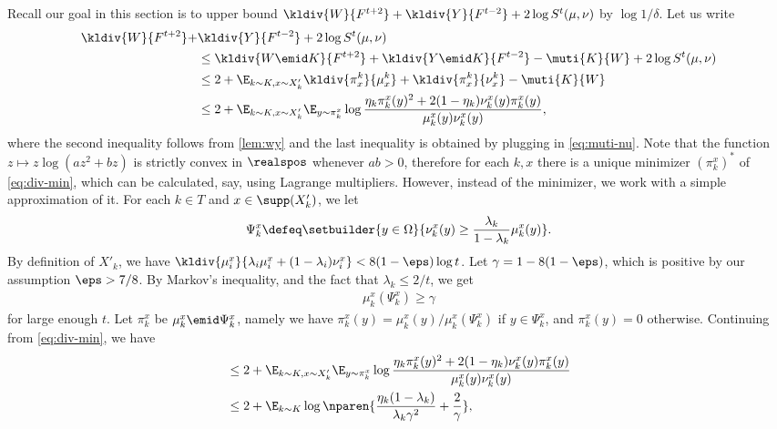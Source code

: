 Recall our goal in this section is to upper bound 
$\kldiv{W}{F^{t+2}} + \kldiv{Y}{F^{t-2}} 
+ 2\log S^t(\mu, \nu)$ by $\log 1/\delta$. 
Let us write
\begin{align}
\kldiv{W}{F^{t+2}} +& \kldiv{Y}{F^{t-2}} 
+ 2\log S^t(\mu, \nu) \nonumber \\
&\le \kldiv{W\emid K}{F^{t+2}} 
  + \kldiv{Y\emid K}{F^{t-2}} 
  - \muti{K}{W} + 2\log S^t(\mu, \nu)
    \nonumber\\
&\le 2 + \E_{k\sim K, x\sim X'_k}
  \kldiv{\pi^k_x}{\mu^k_x} + 
  \kldiv{\pi^k_x}{\nu^k_x} - \muti{K}{W}
        \nonumber\\
&\le 2 + \E_{k\sim K, x\sim X'_k} \E_{y\sim \pi_k^x} \log
\frac{\eta_k \pi_k^x(y)^2 + 2(1-\eta_k)\nu_k^x(y)\pi_k^x(y)}
{\mu_k^x(y)\nu_k^x(y)}\label{eq:div-min},
\end{align}
where the second inequality follows from 
\autoref{lem:wy} and the last inequality is 
obtained by plugging in \autoref{eq:muti-nu}.
Note that the function $z\mapsto z \log(az^2 + bz)$ is 
strictly convex
in $\realspos$ whenever $ab > 0$, therefore 
for each $k,x$ there is a unique minimizer $(\pi_k^x)^*$
of \autoref{eq:div-min},
which can be calculated, say, using Lagrange multipliers. 
However, instead of the minimizer, we work with a simple approximation of it.
For each $k\in T$ and $x\in \supp(X'_k)$, we let
\begin{align*}
\Psi_k^x \defeq \setbuilder{y\in\Omega}
{\nu_k^x(y)\ge \frac{\lambda_k}{1-\lambda_k}\mu_k^x(y)}.
\end{align*}
By definition of $X'_k$, we have
$\kldiv{\mu_i^x}
      {\lambda_i \mu_i^x 
          + (1-\lambda_i)\nu^x_i} < 8(1-\eps)\log t$.
Let $\gamma = 1- 8(1-\eps)$, which is positive by our assumption
$\eps>7/8$.
By Markov's inequality, and the fact that 
$\lambda_k \le 2/t$,
we get
\begin{align*}
\mu_k^x(\Psi_k^x)\ge \gamma
\end{align*}
for large enough $t$.
Let $\pi_k^x$ be $\mu_k^x \emid \Psi_k^x$, namely we have
$\pi_k^x(y) = \mu_k^x(y) / \mu_k^x(\Psi_k^x)$ if 
$y\in\Psi_k^x$, and $\pi_k^x(y) = 0$ otherwise.
Continuing from \autoref{eq:div-min}, we have
\begin{align}
 &\le 2 +  \E_{k\sim K, x\sim X'_k} \E_{y\sim \pi_k^x} \log
\frac{\eta_k \pi_k^x(y)^2 + 2(1-\eta_k)\nu_k^x(y)\pi_k^x(y)}
{\mu_k^x(y)\nu_k^x(y)}\nonumber\\
 &\le 2+ 
 \E_{k\sim K} \log
\nparen{\frac{\eta_k(1-\lambda_k)}{\lambda_k \gamma^2}+\frac{2}{\gamma}},
\label{eq:setsh}
\end{align}
